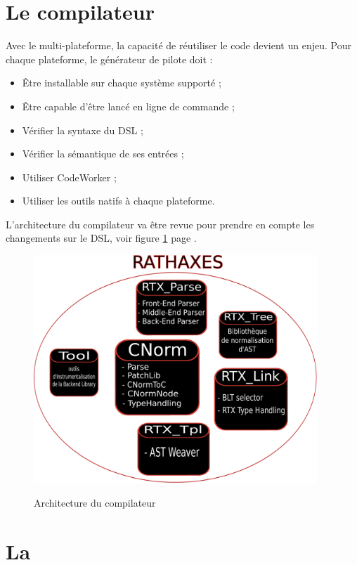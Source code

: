 \documentclass{rtxreport}
\begin{document}
\section{Le compilateur}

Avec le multi-plateforme, la capacité de réutiliser le code devient un enjeu.
Pour chaque plateforme, le générateur de pilote doit :
\begin{itemize}
\item Être installable sur chaque système supporté ;
\item Être capable d'être lancé en ligne de commande ;
\item Vérifier la syntaxe du DSL ;
\item Vérifier la sémantique de ses entrées ;
\item Utiliser CodeWorker\cite{CodeWorker} ;
\item Utiliser les outils natifs à chaque plateforme.
\end{itemize}

L'architecture du compilateur va être revue pour prendre en compte les
changements sur le DSL, voir figure \ref{diagramme} page \pageref{diagramme}.

\begin{figure}
\begin{center}
\caption{Architecture du compilateur}
\includegraphics[width=0.95\textwidth]{../../../../doc/rathaxes/technical/diagramme_architecture.pdf}
\label{diagramme}
\end{center}
\end{figure}

\section{La \BL}
\end{document}
